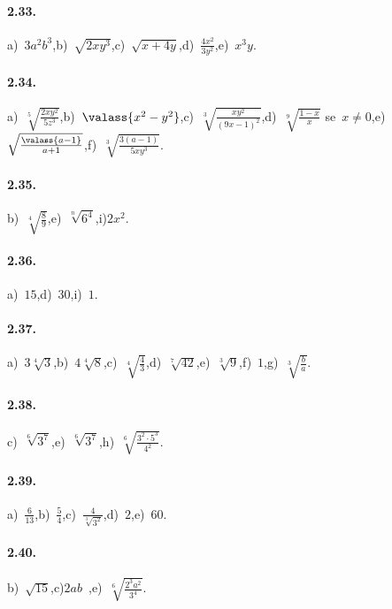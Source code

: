 \paragraph{2.33.}
a)~$3a^2b^3$,\quad b)~$\sqrt{2xy^3}$,\quad c)~$\sqrt{x+4y}$,\quad d)~$\frac{4x^2}{3y^2}$,\quad e)~$x^3y$.

\paragraph{2.34.}
a)~$\sqrt[5]{\frac{2xy^2}{5z^3}}$,\quad b)~$\valass{x^2-y^2}$,\quad c)~$\sqrt[3]{\frac{xy^2}{(9x-1)^2}}$,\quad d)~$\sqrt[9]{\frac{1-x}{x}}$ se~$x\neq 0$,\quad e)~$\sqrt{\frac{\valass{a-1}}{a+1}}$,\quad f)~$\sqrt[3]{\frac{3(a-1)}{5xy^3}}$.

\paragraph{2.35.}
b)~$\sqrt[4]{\frac 8 9}$,\quad e)~$\sqrt[n]{6^4}$,\quad i)$2x^2$.

\paragraph{2.36.}
a)~$15$,\quad d)~$30$,\quad i)~$1$.

\paragraph{2.37.}
a)~$3\sqrt[4]{3}$,\quad b)~$4\sqrt[4]{8}$,\quad c)~$\sqrt[4]{\frac{4}{3}}$,\quad d)~$\sqrt[7]{42}$,\quad e)~$\sqrt[3]{9}$,\quad f)~$1$,\quad g)~$\sqrt[3]{\frac{b}{a}}$.

\paragraph{2.38.}
c)~$\sqrt[6]{3^7}$,\quad e)~$\sqrt[6]{3^7}$,\quad h)~$\sqrt[6]{\frac{3^2\cdot 5^3}{4^2}}$.

\paragraph{2.39.}
a)~$\frac{6}{13}$,\quad b)~$\frac 5 4$,\quad c)~$\frac{4}{\sqrt[3]{3^2}}$,\quad d)~$2$,\quad e)~$60$.

\paragraph{2.40.}
b)~$\sqrt{15}$,\quad c)$2ab$~,\quad e)~$\sqrt[6]{\frac{2^3a^2}{3^4}}$.

